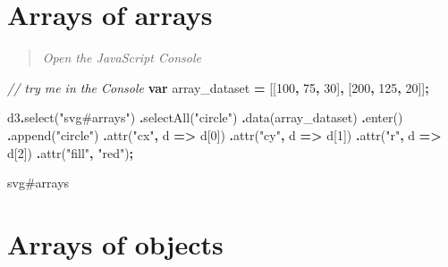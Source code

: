\documentclass[
  openany]{book}
\newenvironment{Shaded}{\begin{snugshade}}{\end{snugshade}}
\newcommand{\CommentTok}[1]{\textcolor[rgb]{0.56,0.35,0.01}{\textit{#1}}}
\newcommand{\DecValTok}[1]{\textcolor[rgb]{0.00,0.00,0.81}{#1}}
\newcommand{\FunctionTok}[1]{\textcolor[rgb]{0.00,0.00,0.00}{#1}}
\newcommand{\KeywordTok}[1]{\textcolor[rgb]{0.13,0.29,0.53}{\textbf{#1}}}
\newcommand{\NormalTok}[1]{#1}
\newcommand{\OperatorTok}[1]{\textcolor[rgb]{0.81,0.36,0.00}{\textbf{#1}}}
\newcommand{\StringTok}[1]{\textcolor[rgb]{0.31,0.60,0.02}{#1}}
\begin{document}
\hypertarget{arrays-of-arrays}{%
\section{Arrays of arrays}\label{arrays-of-arrays}}

\begin{quote}
\emph{Open the JavaScript Console}
\end{quote}

\begin{Shaded}
\begin{Highlighting}[]
\CommentTok{// try me in the Console }
\KeywordTok{var}\NormalTok{ array\_dataset }\OperatorTok{=}\NormalTok{ [[}\DecValTok{100}\OperatorTok{,} \DecValTok{75}\OperatorTok{,} \DecValTok{30}\NormalTok{]}\OperatorTok{,}\NormalTok{ [}\DecValTok{200}\OperatorTok{,} \DecValTok{125}\OperatorTok{,} \DecValTok{20}\NormalTok{]]}\OperatorTok{;}

\NormalTok{d3}\OperatorTok{.}\FunctionTok{select}\NormalTok{(}\StringTok{"svg\#arrays"}\NormalTok{)}
  \OperatorTok{.}\FunctionTok{selectAll}\NormalTok{(}\StringTok{"circle"}\NormalTok{)}
  \OperatorTok{.}\FunctionTok{data}\NormalTok{(array\_dataset)}
  \OperatorTok{.}\FunctionTok{enter}\NormalTok{()}
  \OperatorTok{.}\FunctionTok{append}\NormalTok{(}\StringTok{"circle"}\NormalTok{)}
    \OperatorTok{.}\FunctionTok{attr}\NormalTok{(}\StringTok{"cx"}\OperatorTok{,}\NormalTok{ d }\KeywordTok{=\textgreater{}}\NormalTok{ d[}\DecValTok{0}\NormalTok{])}
    \OperatorTok{.}\FunctionTok{attr}\NormalTok{(}\StringTok{"cy"}\OperatorTok{,}\NormalTok{ d }\KeywordTok{=\textgreater{}}\NormalTok{ d[}\DecValTok{1}\NormalTok{])}
    \OperatorTok{.}\FunctionTok{attr}\NormalTok{(}\StringTok{"r"}\OperatorTok{,}\NormalTok{ d }\KeywordTok{=\textgreater{}}\NormalTok{ d[}\DecValTok{2}\NormalTok{])}
    \OperatorTok{.}\FunctionTok{attr}\NormalTok{(}\StringTok{"fill"}\OperatorTok{,} \StringTok{"red"}\NormalTok{)}\OperatorTok{;}
\end{Highlighting}
\end{Shaded}

svg\#arrays

\hypertarget{arrays-of-objects}{%
\section{Arrays of objects}\label{arrays-of-objects}}
\end{document}
